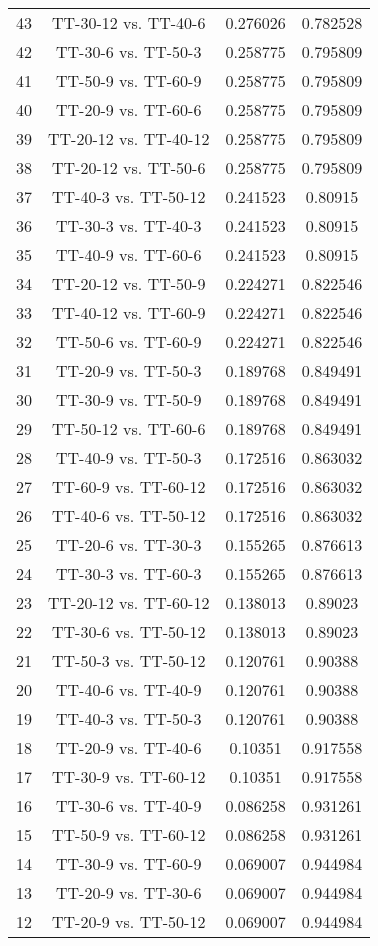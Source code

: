 \documentclass[a4paper,10pt]{article}
\begin{document}
\begin{landscape}
\begin{table}[!htp]
\begin{tabular}{cccc}
43&TT-30-12 vs. TT-40-6&0.276026&0.782528\\
42&TT-30-6 vs. TT-50-3&0.258775&0.795809\\
41&TT-50-9 vs. TT-60-9&0.258775&0.795809\\
40&TT-20-9 vs. TT-60-6&0.258775&0.795809\\
39&TT-20-12 vs. TT-40-12&0.258775&0.795809\\
38&TT-20-12 vs. TT-50-6&0.258775&0.795809\\
37&TT-40-3 vs. TT-50-12&0.241523&0.80915\\
36&TT-30-3 vs. TT-40-3&0.241523&0.80915\\
35&TT-40-9 vs. TT-60-6&0.241523&0.80915\\
34&TT-20-12 vs. TT-50-9&0.224271&0.822546\\
33&TT-40-12 vs. TT-60-9&0.224271&0.822546\\
32&TT-50-6 vs. TT-60-9&0.224271&0.822546\\
31&TT-20-9 vs. TT-50-3&0.189768&0.849491\\
30&TT-30-9 vs. TT-50-9&0.189768&0.849491\\
29&TT-50-12 vs. TT-60-6&0.189768&0.849491\\
28&TT-40-9 vs. TT-50-3&0.172516&0.863032\\
27&TT-60-9 vs. TT-60-12&0.172516&0.863032\\
26&TT-40-6 vs. TT-50-12&0.172516&0.863032\\
25&TT-20-6 vs. TT-30-3&0.155265&0.876613\\
24&TT-30-3 vs. TT-60-3&0.155265&0.876613\\
23&TT-20-12 vs. TT-60-12&0.138013&0.89023\\
22&TT-30-6 vs. TT-50-12&0.138013&0.89023\\
21&TT-50-3 vs. TT-50-12&0.120761&0.90388\\
20&TT-40-6 vs. TT-40-9&0.120761&0.90388\\
19&TT-40-3 vs. TT-50-3&0.120761&0.90388\\
18&TT-20-9 vs. TT-40-6&0.10351&0.917558\\
17&TT-30-9 vs. TT-60-12&0.10351&0.917558\\
16&TT-30-6 vs. TT-40-9&0.086258&0.931261\\
15&TT-50-9 vs. TT-60-12&0.086258&0.931261\\
14&TT-30-9 vs. TT-60-9&0.069007&0.944984\\
13&TT-20-9 vs. TT-30-6&0.069007&0.944984\\
12&TT-20-9 vs. TT-50-12&0.069007&0.944984\\

\end{tabular}
\end{table}
\end{landscape}
\end{document}
